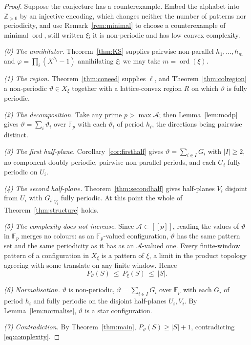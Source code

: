 \documentclass[11pt,reqno]{amsart}
\theoremstyle{plain}
\theoremstyle{definition}
\theoremstyle{remark}
\theoremstyle{plain}
\theoremstyle{remark}
\theoremstyle{definition}
\numberwithin{equation}{section}
\DeclareMathOperator{\ord}{ord}
\newcommand{\Z}{\mathbb{Z}}
\newcommand{\Fp}{\mathbb{F}_p}
\newcommand{\cA}{\mathcal{A}}
\newcommand{\dbr}[1]{[\![#1]\!]}
\begin{document}
\begin{proof}
Suppose the conjecture has a counterexample.  Embed the alphabet into $\Z_{>0}$
by an injective encoding, which changes neither the number of patterns nor
periodicity, and use Remark~\ref{rem:minimal} to choose a counterexample of
minimal $\ord$, still written $\xi$; it is non-periodic and has low convex
complexity.

\emph{(0) The annihilator.}  Theorem~\ref{thm:KS} supplies pairwise
non-parallel $h_1,\dots,h_m$ and $\varphi=\prod_i(X^{h_i}-1)$ annihilating
$\xi$; we may take $m=\ord(\xi)$.

\emph{(1) The region.}  Theorem~\ref{thm:coneed} supplies $\ell$, and
Theorem~\ref{thm:colregion} a non-periodic $\vartheta\in X_\xi$ together with a
lattice-convex region $R$ on which $\vartheta$ is fully periodic.

\emph{(2) The decomposition.}  Take any prime $p>\max\cA$; then
Lemma~\ref{lem:modp} gives $\vartheta=\sum_i\bar\vartheta_i$ over $\Fp$ with
each $\bar\vartheta_i$ of period $h_i$, the directions being pairwise distinct.

\emph{(3) The first half-plane.}  Corollary~\ref{cor:firsthalf} gives
$\vartheta=\sum_{i\in I}G_i$ with $|I|\ge2$, no component doubly periodic,
pairwise non-parallel periods, and each $G_i$ fully periodic on $U_i$.

\emph{(4) The second half-plane.}  Theorem~\ref{thm:secondhalf} gives
half-planes $V_i$ disjoint from $U_i$ with $G_i|_{V_i}$ fully periodic.  At this
point the whole of Theorem~\ref{thm:structure} holds.

\emph{(5) The complexity does not increase.}  Since $\cA\subset\dbr{p}$, reading
the values of $\vartheta$ in $\Fp$ merges no colours: as an $\Fp$-valued
configuration, $\vartheta$ has the same pattern set and the same periodicity as
it has as an $\cA$-valued one.  Every finite-window pattern of a configuration
in $X_\xi$ is a pattern of $\xi$, a limit in the product topology agreeing with
some translate on any finite window.  Hence
\begin{equation}
P_\vartheta(S)\ \le\ P_\xi(S)\ \le\ |S| .
\label{eq:complexity}
\end{equation}

\emph{(6) Normalisation.}  $\vartheta$ is non-periodic,
$\vartheta=\sum_{i\in I}G_i$ over $\Fp$ with each $G_i$ of period $h_i$ and
fully periodic on the disjoint half-planes $U_i,V_i$.  By
Lemma~\ref{lem:normalise}, $\vartheta$ is a star configuration.

\emph{(7) Contradiction.}  By Theorem~\ref{thm:main},
$P_\vartheta(S)\ge|S|+1$, contradicting \eqref{eq:complexity}.
\end{proof}
\end{document}
